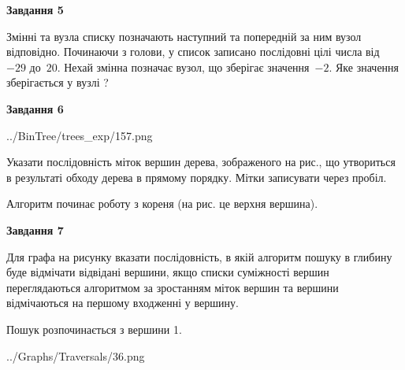 \documentclass[12pt, ukrainian]{article}
\begin{document}
{\begin {large}
{\begin {center}\textbf{Завдання 5}\end {center}}\par
Змінні  та  вузла списку позначають наступний та попередній за ним вузол відповідно. Починаючи з голови, у список записано послідовні цілі числа від~$-29$ до~$20$. Нехай змінна  позначає вузол, що зберігає значення~$-2$.
Яке значення зберігається у вузлі  ?\par
\newpage

{\begin {center}\textbf{Завдання 6}\end {center}}\par

\begin{center}
	{../BinTree/trees_exp/157.png}
\end{center}
Указати послідовність міток вершин дерева, зображеного на рис., що утвориться в результаті обходу дерева в прямому порядку. Мітки записувати через пробіл.\par Алгоритм починає роботу з кореня (на рис. це верхня вершина).\par
\newpage

{\begin {center}\textbf{Завдання 7}\end {center}}\par
Для графа на рисунку вказати послідовність, в якій алгоритм пошуку в глибину буде відмічати відвідані вершини, якщо списки суміжності вершин переглядаються алгоритмом за зростанням міток вершин та вершини відмічаються на першому вход\-женні у вершину.\par
Пошук розпочинається з вершини 1.\par

\begin{center}
	{../Graphs/Traversals/36.png}
\end{center}\par
\newpage


\end{large}}
\end{document}
